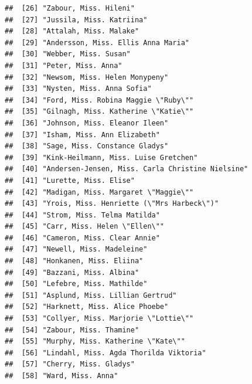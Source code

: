 \documentclass[11pt,]{book}
\begin{document}
\begin{verbatim}
##  [26] "Zabour, Miss. Hileni"                                                 
##  [27] "Jussila, Miss. Katriina"                                              
##  [28] "Attalah, Miss. Malake"                                                
##  [29] "Andersson, Miss. Ellis Anna Maria"                                    
##  [30] "Webber, Miss. Susan"                                                  
##  [31] "Peter, Miss. Anna"                                                    
##  [32] "Newsom, Miss. Helen Monypeny"                                         
##  [33] "Nysten, Miss. Anna Sofia"                                             
##  [34] "Ford, Miss. Robina Maggie \"Ruby\""                                   
##  [35] "Gilnagh, Miss. Katherine \"Katie\""                                   
##  [36] "Johnson, Miss. Eleanor Ileen"                                         
##  [37] "Isham, Miss. Ann Elizabeth"                                           
##  [38] "Sage, Miss. Constance Gladys"                                         
##  [39] "Kink-Heilmann, Miss. Luise Gretchen"                                  
##  [40] "Andersen-Jensen, Miss. Carla Christine Nielsine"                      
##  [41] "Lurette, Miss. Elise"                                                 
##  [42] "Madigan, Miss. Margaret \"Maggie\""                                   
##  [43] "Yrois, Miss. Henriette (\"Mrs Harbeck\")"                             
##  [44] "Strom, Miss. Telma Matilda"                                           
##  [45] "Carr, Miss. Helen \"Ellen\""                                          
##  [46] "Cameron, Miss. Clear Annie"                                           
##  [47] "Newell, Miss. Madeleine"                                              
##  [48] "Honkanen, Miss. Eliina"                                               
##  [49] "Bazzani, Miss. Albina"                                                
##  [50] "Lefebre, Miss. Mathilde"                                              
##  [51] "Asplund, Miss. Lillian Gertrud"                                       
##  [52] "Harknett, Miss. Alice Phoebe"                                         
##  [53] "Collyer, Miss. Marjorie \"Lottie\""                                   
##  [54] "Zabour, Miss. Thamine"                                                
##  [55] "Murphy, Miss. Katherine \"Kate\""                                     
##  [56] "Lindahl, Miss. Agda Thorilda Viktoria"                                
##  [57] "Cherry, Miss. Gladys"                                                 
##  [58] "Ward, Miss. Anna"                                                     

\end{verbatim}
\end{document}
